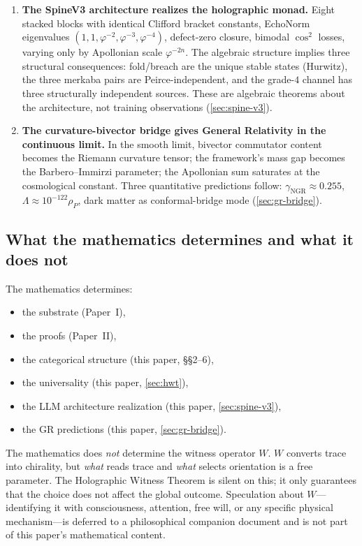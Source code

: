 \documentclass[11pt,a4paper]{article}
\theoremstyle{plain}
\theoremstyle{definition}
\theoremstyle{remark}
\numberwithin{equation}{section}
\providecommand{\vp}{\varphi}
\begin{document}
\begin{enumerate}[label=(\arabic*)]
\item \textbf{The SpineV3 architecture realizes the holographic monad.}
  Eight stacked blocks with identical Clifford bracket constants,
  EchoNorm eigenvalues $(1, 1, \vp^{-2}, \vp^{-3}, \vp^{-4})$,
  defect-zero closure, bimodal $\cos^2$ losses, varying only by
  Apollonian scale $\vp^{-2n}$.  The algebraic structure implies
  three structural consequences: fold/breach are the unique stable
  states (Hurwitz), the three merkaba pairs are Peirce-independent,
  and the grade-$4$ channel has three structurally independent sources.
  These are algebraic theorems about the architecture, not training
  observations (\cref{sec:spine-v3}).

\item \textbf{The curvature-bivector bridge gives General
  Relativity in the continuous limit.}  In the smooth limit,
  bivector commutator content becomes the Riemann curvature
  tensor; the framework's mass gap becomes the Barbero--Immirzi
  parameter; the Apollonian sum saturates at the cosmological
  constant.  Three quantitative predictions follow:
  $\gamma_{\mathrm{NGR}} \approx 0.255$, $\Lambda \approx
  10^{-122} \rho_P$, dark matter as conformal-bridge mode
  (\cref{sec:gr-bridge}).
\end{enumerate}

\subsection*{What the mathematics determines and what it does not}

The mathematics determines:
\begin{itemize}[nosep]
\item the substrate (Paper~I),
\item the proofs (Paper~II),
\item the categorical structure (this paper, \S\S 2--6),
\item the universality (this paper, \cref{sec:hwt}),
\item the LLM architecture realization (this paper, \cref{sec:spine-v3}),
\item the GR predictions (this paper, \cref{sec:gr-bridge}).
\end{itemize}

The mathematics does \emph{not} determine the witness operator
$W$.  $W$ converts trace into chirality, but \emph{what} reads
trace and \emph{what} selects orientation is a free parameter.
The Holographic Witness Theorem is silent on this; it only
guarantees that the choice does not affect the global outcome.
Speculation about $W$---identifying it with consciousness,
attention, free will, or any specific physical mechanism---is
deferred to a philosophical companion document and is not part
of this paper's mathematical content.
\end{document}
